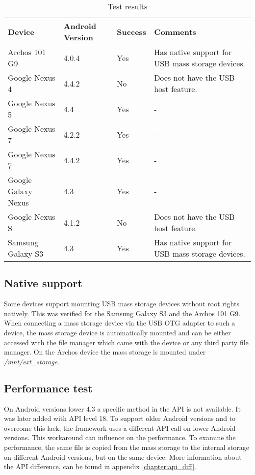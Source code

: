 \begin{table}[ht]
\caption{Test results}
\centering
\begin{tabular}{|l|l|l|p{5.5cm}|}
\hline\hline
\textbf{Device} & \textbf{Android Version} & \textbf{Success} & \textbf{Comments} \\ \hline
Archos 101 G9 & 4.0.4 & Yes & Has native support for USB mass storage devices. \\ \hline
Google Nexus 4 & 4.4.2 & No & Does not have the USB host feature\cite{nexus_4_usb_host}. \\ \hline
Google Nexus 5 & 4.4 & Yes & - \\ \hline
Google Nexus 7 & 4.2.2 & Yes & - \\ \hline
Google Nexus 7 & 4.4.2 & Yes & - \\ \hline
Google Galaxy Nexus & 4.3 & Yes & - \\ \hline
Google Nexus S & 4.1.2 & No & Does not have the USB host feature. \\ \hline
Samsung Galaxy S3 & 4.3 & Yes & Has native support for USB mass storage devices. \\ \hline
\end{tabular}
\label{table:test_results}
\end{table}

\subsection{Native support}

Some devices support mounting USB mass storage devices without root rights natively. This was verified for the Samsung Galaxy S3 and the Archos 101 G9. When connecting a mass storage device via the USB OTG adapter to such a device, the mass storage device is automatically mounted and can be either accessed with the file manager which came with the device or any third party file manager. On the Archos device the mass storage is mounted under \textit{/mnt/ext\_storage}.

\subsection{Performance test}

On Android versions lower 4.3 a specific method in the API is not available. It was later added with API level 18. To support older Android versions and to overcome this lack, the framework uses a different API call on lower Android versions. This workaround can influence on the performance. To examine the performance, the same file is copied from the mass storage to the internal storage on different Android versions, but on the same device. More information about the API difference, can be found in appendix \ref{chapter:api_diff}.

